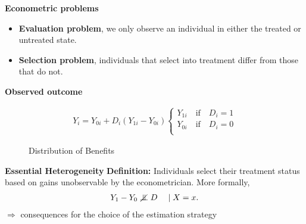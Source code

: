 \begin{frame}\textbf{Econometric problems}

\begin{itemize}\setlength\itemsep{1em}
\item \textbf{Evaluation problem}, we only observe an individual in either the treated or untreated state.
\item \textbf{Selection problem}, individuals that select into treatment differ from those that do not.
\end{itemize}

\end{frame}
\begin{frame}\textbf{Observed outcome}

\begin{align*}
Y_i = Y_{0i} + D_i (Y_{1i} - Y_{0i})
\begin{cases}
Y_{1i}\quad\text{if}\quad D_{i} = 1 \\
Y_{0i}\quad\text{if}\quad D_{i} = 0 \\
\end{cases}
\end{align*}

\end{frame}
\begin{frame}
	\begin{figure}\caption{Distribution of Benefits}
	\end{figure}
\end{frame}
\begin{frame}
	\textbf{Essential Heterogeneity}\vspace{0.5cm}
	\textbf{Definition:} Individuals select their treatment status based on
	gains unobservable by the econometrician. More formally,
	\begin{align*}
		Y_1 - Y_0 \notindep D\quad \mid X = x.
	\end{align*}
	\(\Rightarrow\) consequences for the choice of the estimation strategy
\end{frame}
